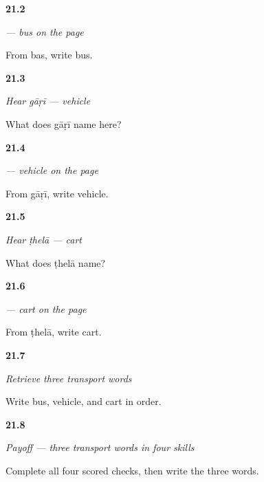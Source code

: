 \noindent\begin{minipage}[t]{\linewidth}
\raggedright
\hypertarget{review-MW-C16-bas-dictation}{\textbf{21.2}} \emph{ — bus on the page}\par
\small From bas, write bus.
\end{minipage}\par\medskip

\noindent\begin{minipage}[t]{\linewidth}
\raggedright
\hypertarget{review-MW-C16-hear-gaadi-meaning}{\textbf{21.3}} \emph{Hear \emph{gāṛī} — vehicle}\par
\small What does gāṛī name here?
\end{minipage}\par\medskip

\noindent\begin{minipage}[t]{\linewidth}
\raggedright
\hypertarget{review-MW-C16-gaadi-dictation}{\textbf{21.4}} \emph{ — vehicle on the page}\par
\small From gāṛī, write vehicle.
\end{minipage}\par\medskip

\noindent\begin{minipage}[t]{\linewidth}
\raggedright
\hypertarget{review-MW-C16-hear-thela-meaning}{\textbf{21.5}} \emph{Hear \emph{ṭhelā} — cart}\par
\small What does ṭhelā name?
\end{minipage}\par\medskip

\noindent\begin{minipage}[t]{\linewidth}
\raggedright
\hypertarget{review-MW-C16-thela-dictation}{\textbf{21.6}} \emph{ — cart on the page}\par
\small From ṭhelā, write cart.
\end{minipage}\par\medskip

\noindent\begin{minipage}[t]{\linewidth}
\raggedright
\hypertarget{review-MW-R16-transport-three-recall}{\textbf{21.7}} \emph{Retrieve three transport words}\par
\small Write bus, vehicle, and cart in order.
\end{minipage}\par\medskip

\noindent\begin{minipage}[t]{\linewidth}
\raggedright
\hypertarget{review-MW-C16-transport-three-payoff}{\textbf{21.8}} \emph{Payoff — three transport words in four skills}\par
\small Complete all four scored checks, then write the three words.
\end{minipage}\par\medskip

